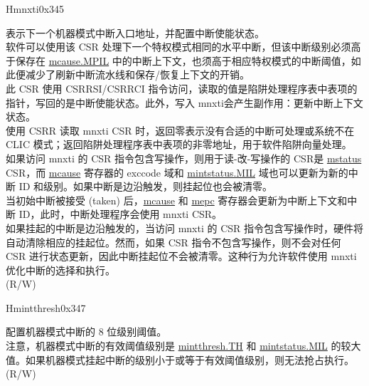 \begin{register}{H}{mnxti}{0x345}\label{regdesc:MNXTI_REG}
%
\regnewline%
\begin{regdesc}\begin{reglist}
\label{fielddesc:MNXTI}\item [MNXTI]
表示下一个机器模式中断入口地址，并配置中断使能状态。\\
软件可以使用该 CSR 处理下一个特权模式相同的水平中断，但该中断级别必须高于保存在 \hyperref[fielddesc:MCAUSE_MPIL]{{mcause.MPIL}} 中的中断上下文，也须高于相应特权模式的中断阈值，如此便减少了刷新中断流水线和保存/恢复上下文的开销。\\
此 CSR 使用 CSRRSI/CSRRCI 指令访问，读取的值是陷阱处理程序表中表项的指针，写回的是中断使能状态。此外，写入 mnxti会产生副作用：更新中断上下文状态。\\
使用 CSRR 读取 mnxti CSR 时，返回零表示没有合适的中断可处理或系统不在 CLIC 模式；返回陷阱处理程序表中表项的非零地址，用于软件陷阱向量处理。\\
如果访问 mnxti 的 CSR 指令包含写操作，则用于读-改-写操作的 CSR是 \hyperref[regdesc:MSTATUS]{mstatus} CSR，而 \hyperref[regdesc:MCAUSE]{mcause} 寄存器的 exccode 域和 \hyperref[fielddesc:MINTSTATUS_MIL]{mintstatus.MIL} 域也可以更新为新的中断 ID 和级别。如果中断是边沿触发，则挂起位也会被清零。\\
当初始中断被接受 (taken) 后，\hyperref[regdesc:MCAUSE]{mcause} 和 \hyperref[regdesc:MEPC]{mepc} 寄存器会更新为中断上下文和中断 ID，此时，中断处理程序会使用 mnxti CSR。\\
如果挂起的中断是边沿触发的，当访问 mnxti 的 CSR 指令包含写操作时，硬件将自动清除相应的挂起位。然而，如果 CSR 指令不包含写操作，则不会对任何 CSR 进行状态更新，因此中断挂起位不会被清零。这种行为允许软件使用 mnxti 优化中断的选择和执行。\\
(R/W)
\end{reglist}\end{regdesc}
\end{register}

\begin{register}{H}{mintthresh}{0x347}\label{regdesc:MINTTHRESH}
%
%
\regnewline%
\begin{regdesc}\begin{reglist}
\label{fielddesc:MINTTHRESH_TH}\item [TH] 配置机器模式中断的 8 位级别阈值。 \\
注意，机器模式中断的有效阈值级别是 \hyperref[fielddesc:MINTTHRESH_TH]{{mintthresh.TH}} 和 \hyperref[fielddesc:MINTSTATUS_MIL]{{mintstatus.MIL}} 的较大值。如果机器模式挂起中断的级别小于或等于有效阈值级别，则无法抢占执行。\\
(R/W)
\end{reglist}\end{regdesc}
\end{register}


